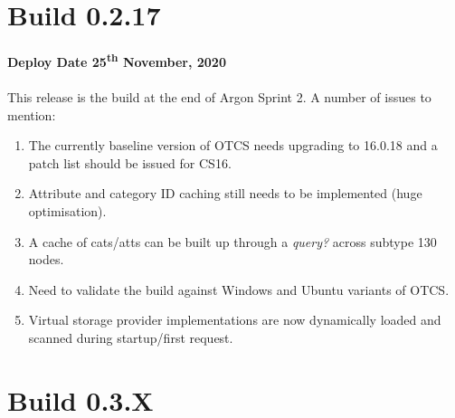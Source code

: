 \documentclass{book}
\begin{document}
\section{Build 0.2.17}
\textbf{Deploy Date 25\textsuperscript{th} November, 2020}
\paragraph{}
This release is the build at the end of Argon Sprint 2.  A number of issues to mention:
\begin{enumerate}
    \item The currently baseline version of OTCS needs upgrading to 16.0.18 and a patch list should be issued for CS16.
    \item Attribute and category ID caching still needs to be implemented (huge optimisation).
    \item A cache of cats/atts can be built up through a \textit{query?} across subtype 130 nodes.
    \item Need to validate the build against Windows and Ubuntu variants of OTCS.
    \item Virtual storage provider implementations are now dynamically loaded and scanned during startup/first request.
\end{enumerate}
\section{Build 0.3.X}
\end{document}
